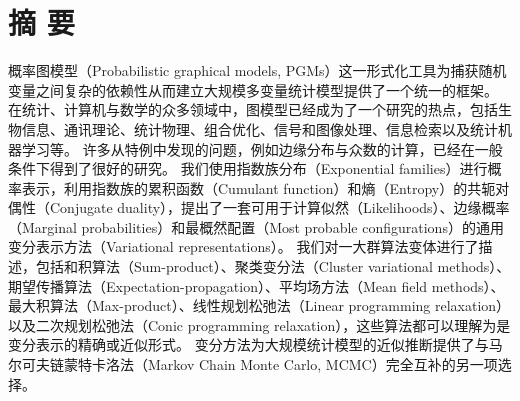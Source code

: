 \chapter*{摘 \quad 要}

概率图模型（Probabilistic graphical models, PGMs）这一形式化工具为捕获随机变量之间复杂的依赖性从而建立大规模多变量统计模型提供了一个统一的框架。
在统计、计算机与数学的众多领域中，图模型已经成为了一个研究的热点，包括生物信息、通讯理论、统计物理、组合优化、信号和图像处理、信息检索以及统计机器学习等。
许多从特例中发现的问题，例如边缘分布与众数的计算，已经在一般条件下得到了很好的研究。
我们使用指数族分布（Exponential families）进行概率表示，利用指数族的累积函数（Cumulant function）和熵（Entropy）的共轭对偶性（Conjugate duality），提出了一套可用于计算似然（Likelihoods）、边缘概率（Marginal probabilities）和最概然配置（Most probable configurations）的通用变分表示方法（Variational representations）。
我们对一大群算法变体进行了描述，包括和积算法（Sum-product）、聚类变分法（Cluster variational methods）、期望传播算法（Expectation-propagation）、平均场方法（Mean field methods）、最大积算法（Max-product）、线性规划松弛法（Linear programming relaxation）以及二次规划松弛法（Conic programming relaxation），这些算法都可以理解为是变分表示的精确或近似形式。
变分方法为大规模统计模型的近似推断提供了与马尔可夫链蒙特卡洛法（Markov Chain Monte Carlo, MCMC）完全互补的另一项选择。
